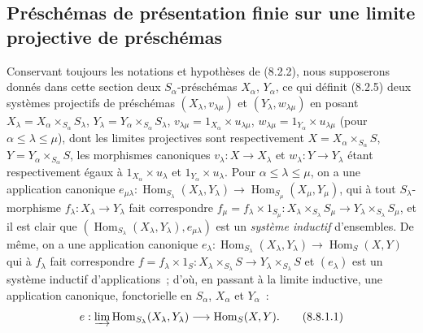 \subsection{Préschémas de présentation finie sur une limite projective de préschémas}
\label{subsection:IV.8.8-fr}

\begin{env}[8.8.1]
\label{IV.8.8.1-fr}
Conservant toujours les notations et hypothèses de (8.2.2), nous supposerons
donnés dans cette section deux $S_\alpha$-préschémas $X_\alpha$, $Y_\alpha$,
ce qui définit (8.2.5) deux systèmes projectifs de préschémas
$(X_\lambda,v_{\lambda\mu})$ et $(Y_\lambda,w_{\lambda\mu})$ en posant
$X_\lambda=X_\alpha\times_{S_\alpha}S_\lambda$,
$Y_\lambda=Y_\alpha\times_{S_\alpha}S_\lambda$,
$v_{\lambda\mu}=1_{X_\alpha}\times u_{\lambda\mu}$,
$w_{\lambda\mu}=1_{Y_\alpha}\times u_{\lambda\mu}$ (pour
$\alpha\leq\lambda\leq\mu$), dont les limites projectives sont respectivement
$X=X_\alpha\times_{S_\alpha}S$, $Y=Y_\alpha\times_{S_\alpha}S$, les
morphismes canoniques $v_\lambda:X\to X_\lambda$ et
$w_\lambda:Y\to Y_\lambda$ étant respectivement égaux à
$1_{X_\alpha}\times u_\lambda$ et $1_{Y_\alpha}\times u_\lambda$. Pour
$\alpha\leq\lambda\leq\mu$, on a une application canonique
$e_{\mu\lambda}:\operatorname{Hom}_{S_\lambda}(X_\lambda,Y_\lambda)\to
\operatorname{Hom}_{S_\mu}(X_\mu,Y_\mu)$, qui à tout $S_\lambda$-morphisme
$f_\lambda:X_\lambda\to Y_\lambda$ fait correspondre
$f_\mu=f_\lambda\times1_{S_\mu}:X_\lambda\times_{S_\lambda}S_\mu\to
Y_\lambda\times_{S_\lambda}S_\mu$, et il est clair que
$(\operatorname{Hom}_{S_\lambda}(X_\lambda,Y_\lambda),e_{\mu\lambda})$ est un
\emph{système inductif} d'ensembles. De même, on a une application canonique
$e_\lambda:\operatorname{Hom}_{S_\lambda}(X_\lambda,Y_\lambda)\to
\operatorname{Hom}_S(X,Y)$ qui à $f_\lambda$ fait correspondre
$f=f_\lambda\times1_S:X_\lambda\times_{S_\lambda}S\to
Y_\lambda\times_{S_\lambda}S$ et $(e_\lambda)$ est un système inductif
d'applications~; d'où, en passant à la limite inductive, une application
canonique, fonctorielle en $S_\alpha$, $X_\alpha$ et $Y_\alpha$~:
\begin{equation}
e:\varinjlim\operatorname{Hom}_{S_\lambda}(X_\lambda,Y_\lambda)
\longrightarrow\operatorname{Hom}_S(X,Y).
\tag{8.8.1.1}\label{IV.8.8.1.1-fr}
\end{equation}
\end{env}

